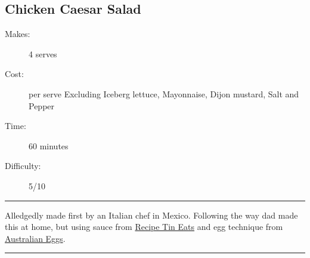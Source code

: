 \documentclass[]{article}
\begin{document}
\large
{}\label{rec:Chicken Caesar Salad}
\subsection*{\center\huge Chicken Caesar Salad}
\begin{description}
\item[Makes:] 4 serves
\item[Cost:]  per serve Excluding Iceberg lettuce, Mayonnaise, Dijon mustard, Salt and Pepper
\item[Time:] 60 minutes
\item[Difficulty:] 5/10
\end{description}
\vspace{0.2cm}\hrule\vspace{0.5cm}
\begin{adjustwidth}{0.5 cm}{0.5 cm}

Alledgedly made first by an Italian chef in Mexico. Following the way dad made this at home, but using sauce from \href{https://www.recipetineats.com/chicken-caesar-salad/}{Recipe Tin Eats} and egg technique from \href{https://www.australianeggs.org.au/recipes-and-cooking/easy-boiled-eggs}{Australian Eggs}. \hfill{}\color{black}

\end{adjustwidth}
\vspace{0.5cm}\hrule
\end{document}
